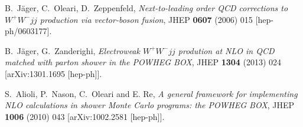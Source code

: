 \documentclass[a4paper,11pt]{article}
\begin{document}
%
\begin{thebibliography}{99}
 B.~J\"ager, C.~Oleari, D.~Zeppenfeld, {\em
    Next-to-leading order QCD corrections to $W^+W^-jj$ 
    production via vector-boson fusion},  JHEP {\bf 0607} (2006)
  015  [hep-ph/0603177].

 B.~J\"ager, G.~Zanderighi, {\em Electroweak $W^+W^-jj$ prodution at
  NLO in QCD matched with parton shower in the POWHEG BOX},  JHEP {\bf 1304} (2013)
  024  [arXiv:1301.1695 [hep-ph]].
  
 S.~Alioli, P.~Nason, C.~Oleari and E. Re, {\em
    A general framework for implementing NLO calculations in shower
    Monte Carlo programs: the POWHEG BOX}, JHEP {\bf 1006} (2010)
  043  [arXiv:1002.2581 [hep-ph]].

\end{thebibliography}
\end{document}
